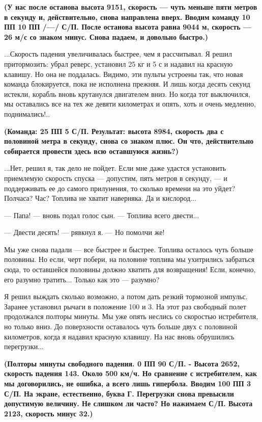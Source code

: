 \documentclass[11pt,a4paper,oneside]{article}
\begin{document}
\textbf{
(У нас после останова высота 9151, скорость — чуть меньше пяти метров в секунду и, действительно, снова направлена вверх. Вводим команду 10 ПП 10 ПП /—/ С/П. После останова высота равна 9044 м, скорость — 26 м/с со знаком минус. Снова падаем, и довольно быстро.)}

...Скорость падения увеличивалась быстрее, чем я рассчитывал. Я решил притормозить: убрал реверс, установил 25 кг и 5 с и надавил на красную клавишу. Но она не поддалась. Видимо, эти пульты устроены так, что новая команда блокируется, пока не исполнена прежняя. И лишь когда десять секунд истекли, корабль вновь крутанулся двигателем вниз. Но когда тот выключился, мы оставались все на тех же девяти километрах и опять, хоть и очень медленно, поднимались!..

\textbf{
(Команда: 25 ПП 5 С/П. Результат: высота 8984, скорость два с половиной метра в секунду, снова со знаком плюс. Он что, действительно собирается провести здесь всю оставшуюся жизнь?)}

...Нет, решил я, так дело не пойдет. Если мне даже удастся установить приемлемую скорость спуска — допустим, пять метров в секунду, — и поддерживать ее до самого прилунения, то сколько времени на это уйдет? Полчаса? Час? Топлива не хватит наверняка. Да и кислород...

— Папа! — вновь подал голос сын. — Топлива всего двести...

— Двести десять! — рявкнул я. — Но помолчи же!

Мы уже снова падали — все быстрее и быстрее. Топлива осталось чуть больше половины. Но если, черт побери, на половине топлива мы ухитрились забраться сюда, то оставшейся половины должно хватить для возвращения! Если, конечно, его разумно тратить... Только как это — разумно?

Я решил выждать сколько возможно, а потом дать резкий тормозной импульс. Заранее установил рычаги в положение 100 и 3. На этот раз свободный полет продолжался полторы минуты. Мы уже опять неслись со скоростью истребителя, но только вниз. До поверхности оставалось чуть больше двух с половиной километров, когда я надавил красную клавишу. На нас вновь обрушились перегрузки...

\textbf{
(Полторы минуты свободного падения. 0 ПП 90 С/П. - Высота 2652, скорость падения 143. Около 500 км/ч. Но сравнение с истребителем, как мы договорились, не ошибка, а всего лишь гипербола. Вводим 100 ПП 3 С/П. На экране, естественно, буква Г. Перегрузки снова превысили допустимую величину. Не слишком ли часто? Но нажимаем С/П. Высота 2123, скорость минус 32.)}
\end{document}
